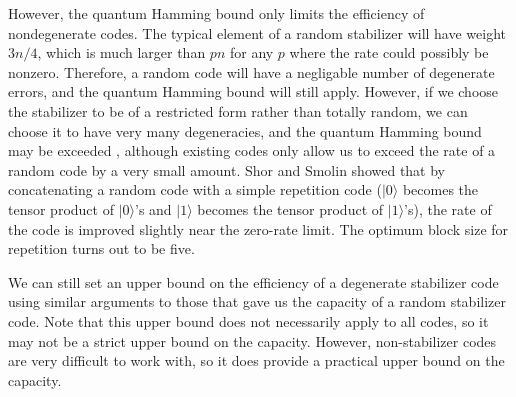 \documentclass{report}
\newcommand{\ket}[1]{|{#1}\rangle}
\begin{document}
However, the quantum Hamming bound only limits the efficiency of 
nondegenerate codes.  The typical element of a random stabilizer will have 
weight $3n/4$, which is much larger than $pn$ for any $p$ where the rate 
could possibly be nonzero.  Therefore, a random code will have a 
negligable number of degenerate errors, and the quantum Hamming bound 
will still apply.  However, if we choose the stabilizer to be of a restricted 
form rather than totally random, we can choose it to have very many 
degeneracies, and the quantum Hamming bound may be exceeded
\cite{shor-smolin}, although existing codes only allow us to exceed the 
rate of a random code by a very small amount.  Shor and Smolin showed that
by concatenating a random code with a simple repetition code ($\ket{0}$
becomes the tensor product of $\ket{0}$'s and $\ket{1}$ becomes the tensor
product of $\ket{1}$'s), the rate of the code is improved slightly near the
zero-rate limit.  The optimum block size for repetition turns out to be five.

We can still set an upper bound on the efficiency of a degenerate stabilizer 
code using similar arguments to those that gave us the capacity of a 
random stabilizer code.  Note that this upper bound does not necessarily 
apply to all codes, so it may not be a strict upper bound on the capacity.  
However, non-stabilizer codes are very difficult to work with, so it does 
provide a practical upper bound on the capacity.
\end{document}
